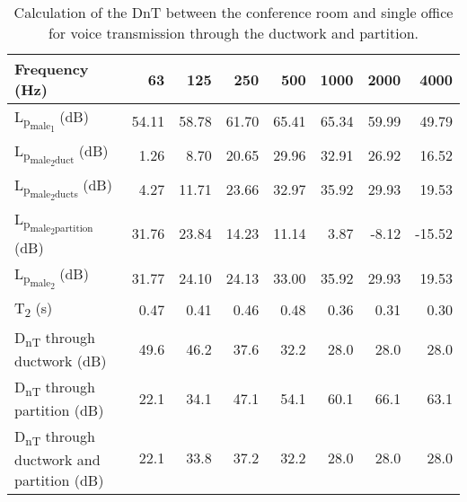 \begin{table}[htbp]
	\caption{Calculation of the DnT between the conference room and single office for voice transmission through the ductwork and partition.}
	\label{tbl:DnT}
	\centering
	\begin{tabular}{@{}lrrrrrrr@{}}
		\toprule
		Frequency (Hz) & 63 & 125 & 250 & 500 & 1000 & 2000 & 4000 \\ \midrule
		L\textsubscript{p\textsubscript{male\textsubscript{1}}} (dB) & 54.11 & 58.78 & 61.70 & 65.41 & 65.34 & 59.99 & 49.79 \\
		L\textsubscript{p\textsubscript{male\textsubscript{2}duct}} (dB) & 1.26 & 8.70 & 20.65 & 29.96 & 32.91 & 26.92 & 16.52 \\
		L\textsubscript{p\textsubscript{male\textsubscript{2}ducts}} (dB) & 4.27 & 11.71 & 23.66 & 32.97 & 35.92 & 29.93 & 19.53 \\
		L\textsubscript{p\textsubscript{male\textsubscript{2}partition}} (dB) & 31.76 & 23.84 & 14.23 & 11.14 & 3.87 & -8.12 & -15.52 \\
		L\textsubscript{p\textsubscript{male\textsubscript{2}}} (dB) & 31.77 & 24.10 & 24.13 & 33.00 & 35.92 & 29.93 & 19.53 \\
		T\textsubscript{2} (s) & 0.47 & 0.41 & 0.46 & 0.48 & 0.36 & 0.31 & 0.30 \\
		D\textsubscript{nT} through ductwork (dB) & 49.6 & 46.2 & 37.6 & 32.2 & 28.0 & 28.0 & 28.0 \\
		D\textsubscript{nT} through partition (dB) & 22.1 & 34.1 & 47.1 & 54.1 & 60.1 & 66.1 & 63.1 \\
		D\textsubscript{nT} through ductwork and partition (dB) & 22.1 & 33.8 & 37.2 & 32.2 & 28.0 & 28.0 & 28.0 \\ \bottomrule
	\end{tabular}
\end{table}